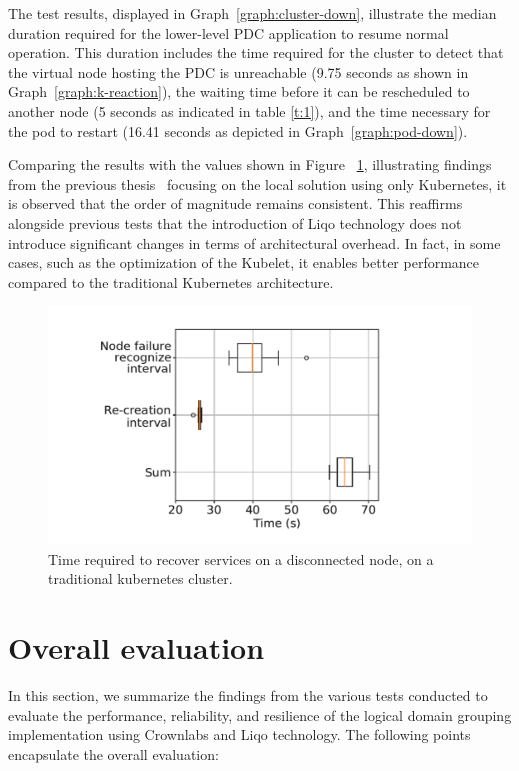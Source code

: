 The test results, displayed in Graph~\ref{graph:cluster-down}, illustrate the median duration required for the lower-level PDC application to resume normal operation. This duration includes the time required for the cluster to detect that the virtual node hosting the PDC is unreachable (9.75 seconds as shown in Graph~\ref{graph:k-reaction}), the waiting time before it can be rescheduled to another node (5 seconds as indicated in table \ref{t:1}), and the time necessary for the pod to restart (16.41 seconds as depicted in Graph~\ref{graph:pod-down}).

Comparing the results with the values shown in Figure ~\ref{fig:seba}, illustrating findings from the previous thesis~\cite{e3-1} focusing on the local solution using only Kubernetes, it is observed that the order of magnitude remains consistent. This reaffirms alongside previous tests that the introduction of Liqo technology does not introduce significant changes in terms of architectural overhead. In fact, in some cases, such as the optimization of the Kubelet, it enables better performance compared to the traditional Kubernetes architecture.


\begin{figure}[ht]\centering
\includegraphics[scale=0.5]{Pictures/seba}
\caption{Time required to recover services on a disconnected node, on a traditional kubernetes cluster.}\label{fig:seba}
\end{figure}

\section{Overall evaluation}
In this section, we summarize the findings from the various tests conducted to evaluate the performance, reliability, and resilience of the logical domain grouping implementation using Crownlabs and Liqo technology. The following points encapsulate the overall evaluation:


